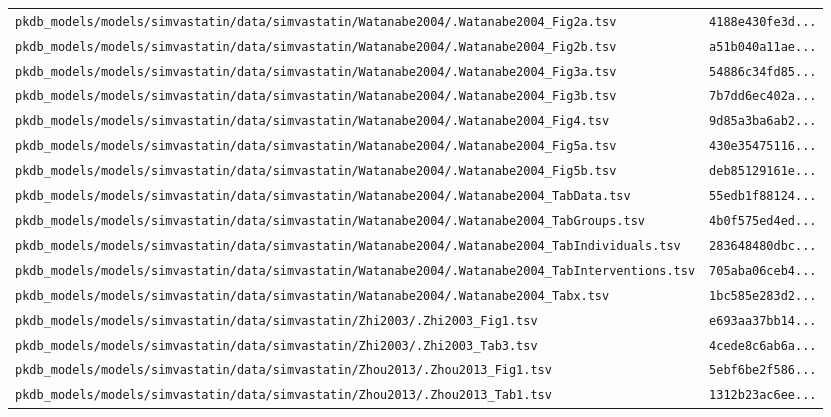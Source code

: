 \documentclass{article}
\begin{document}
\begin{longtable}{ll}
\texttt{pkdb\_models/models/simvastatin/data/simvastatin/Watanabe2004/.Watanabe2004\_Fig2a.tsv} & \texttt{4188e430fe3d...} \\
\texttt{pkdb\_models/models/simvastatin/data/simvastatin/Watanabe2004/.Watanabe2004\_Fig2b.tsv} & \texttt{a51b040a11ae...} \\
\texttt{pkdb\_models/models/simvastatin/data/simvastatin/Watanabe2004/.Watanabe2004\_Fig3a.tsv} & \texttt{54886c34fd85...} \\
\texttt{pkdb\_models/models/simvastatin/data/simvastatin/Watanabe2004/.Watanabe2004\_Fig3b.tsv} & \texttt{7b7dd6ec402a...} \\
\texttt{pkdb\_models/models/simvastatin/data/simvastatin/Watanabe2004/.Watanabe2004\_Fig4.tsv} & \texttt{9d85a3ba6ab2...} \\
\texttt{pkdb\_models/models/simvastatin/data/simvastatin/Watanabe2004/.Watanabe2004\_Fig5a.tsv} & \texttt{430e35475116...} \\
\texttt{pkdb\_models/models/simvastatin/data/simvastatin/Watanabe2004/.Watanabe2004\_Fig5b.tsv} & \texttt{deb85129161e...} \\
\texttt{pkdb\_models/models/simvastatin/data/simvastatin/Watanabe2004/.Watanabe2004\_TabData.tsv} & \texttt{55edb1f88124...} \\
\texttt{pkdb\_models/models/simvastatin/data/simvastatin/Watanabe2004/.Watanabe2004\_TabGroups.tsv} & \texttt{4b0f575ed4ed...} \\
\texttt{pkdb\_models/models/simvastatin/data/simvastatin/Watanabe2004/.Watanabe2004\_TabIndividuals.tsv} & \texttt{283648480dbc...} \\
\texttt{pkdb\_models/models/simvastatin/data/simvastatin/Watanabe2004/.Watanabe2004\_TabInterventions.tsv} & \texttt{705aba06ceb4...} \\
\texttt{pkdb\_models/models/simvastatin/data/simvastatin/Watanabe2004/.Watanabe2004\_Tabx.tsv} & \texttt{1bc585e283d2...} \\
\texttt{pkdb\_models/models/simvastatin/data/simvastatin/Zhi2003/.Zhi2003\_Fig1.tsv} & \texttt{e693aa37bb14...} \\
\texttt{pkdb\_models/models/simvastatin/data/simvastatin/Zhi2003/.Zhi2003\_Tab3.tsv} & \texttt{4cede8c6ab6a...} \\
\texttt{pkdb\_models/models/simvastatin/data/simvastatin/Zhou2013/.Zhou2013\_Fig1.tsv} & \texttt{5ebf6be2f586...} \\
\texttt{pkdb\_models/models/simvastatin/data/simvastatin/Zhou2013/.Zhou2013\_Tab1.tsv} & \texttt{1312b23ac6ee...} \\

\end{longtable}
\end{document}
